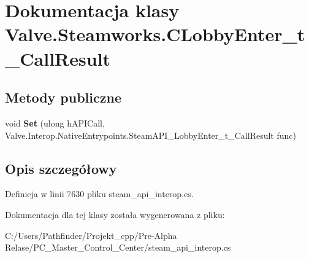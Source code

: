 \hypertarget{class_valve_1_1_steamworks_1_1_c_lobby_enter__t___call_result}{}\section{Dokumentacja klasy Valve.\+Steamworks.\+C\+Lobby\+Enter\+\_\+t\+\_\+\+Call\+Result}
\label{class_valve_1_1_steamworks_1_1_c_lobby_enter__t___call_result}
\subsection*{Metody publiczne}
\begin{DoxyCompactItemize}
\item 
\mbox{\label{class_valve_1_1_steamworks_1_1_c_lobby_enter__t___call_result_a654f7b38b535d48ff4a2cc6f09522c41}} 
void {\bfseries Set} (ulong h\+A\+P\+I\+Call, Valve.\+Interop.\+Native\+Entrypoints.\+Steam\+A\+P\+I\+\_\+\+Lobby\+Enter\+\_\+t\+\_\+\+Call\+Result func)
\end{DoxyCompactItemize}


\subsection{Opis szczegółowy}


Definicja w linii 7630 pliku steam\+\_\+api\+\_\+interop.\+cs.



Dokumentacja dla tej klasy została wygenerowana z pliku\+:\begin{DoxyCompactItemize}
\item 
C\+:/\+Users/\+Pathfinder/\+Projekt\+\_\+cpp/\+Pre-\/\+Alpha Relase/\+P\+C\+\_\+\+Master\+\_\+\+Control\+\_\+\+Center/steam\+\_\+api\+\_\+interop.\+cs\end{DoxyCompactItemize}
